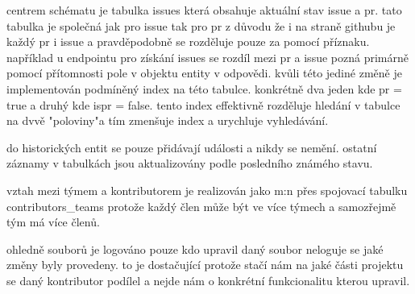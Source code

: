 centrem schématu je tabulka issues která obsahuje aktuální stav issue a pr. tato tabulka je společná jak pro issue tak pro pr z důvodu že i na straně githubu je každý pr i issue a pravděpodobně se rozděluje pouze za pomocí příznaku. například u endpointu pro získání issues se rozdíl mezi pr a issue pozná primárně pomocí přítomnosti pole  v objektu entity v odpovědi. kvůli této jediné změně je implementován podmíněný index na této tabulce. konkrétně dva jeden kde pr = true a druhý kde ispr = false. tento index effektivně rozděluje hledání v tabulce na dvvě "poloviny"a tím zmenšuje index a urychluje vyhledávání.

do historických entit se pouze přidávají události a nikdy se nemění. ostatní záznamy v tabulkách jsou aktualizovány podle posledního známého stavu.

vztah mezi týmem a kontributorem je realizován jako m:n přes spojovací tabulku contributors\_teams protože každý člen může být ve více týmech a samozřejmě tým má více členů.

ohledně souborů je logováno pouze kdo upravil daný soubor neloguje se jaké změny byly provedeny. to je dostačující protože stačí nám na jaké části projektu se daný kontributor podílel a nejde nám o konkrétní funkcionalitu kterou upravil.
